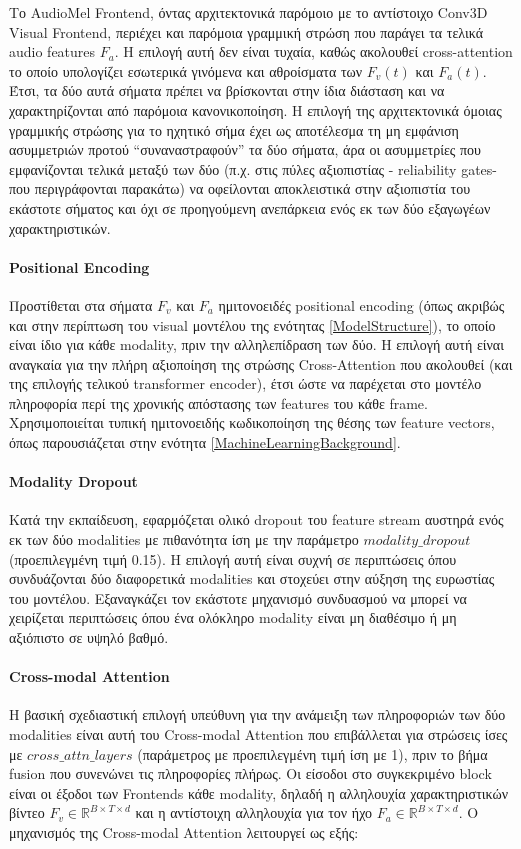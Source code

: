 Το AudioMel Frontend, όντας αρχιτεκτονικά παρόμοιο με το αντίστοιχο Conv3D Visual Frontend, περιέχει και παρόμοια γραμμική στρώση που παράγει τα τελικά audio features $F_a$. Η επιλογή αυτή δεν είναι τυχαία, καθώς ακολουθεί cross-attention το οποίο υπολογίζει εσωτερικά γινόμενα και αθροίσματα των $F_v(t)$ και $F_a(t)$. Έτσι, τα δύο αυτά σήματα πρέπει να βρίσκονται στην ίδια διάσταση και να χαρακτηρίζονται από παρόμοια κανονικοποίηση. Η επιλογή της αρχιτεκτονικά όμοιας γραμμικής στρώσης για το ηχητικό σήμα έχει ως αποτέλεσμα τη μη εμφάνιση ασυμμετριών προτού ``συναναστραφούν'' τα δύο σήματα, άρα οι ασυμμετρίες που εμφανίζονται τελικά μεταξύ των δύο (π.χ. στις πύλες αξιοπιστίας - reliability gates- που περιγράφονται παρακάτω) να οφείλονται αποκλειστικά στην αξιοπιστία του εκάστοτε σήματος και όχι σε προηγούμενη ανεπάρκεια ενός εκ των δύο εξαγωγέων χαρακτηριστικών.

\paragraph{Positional Encoding}
Προστίθεται στα σήματα $F_v$ και $F_a$ ημιτονοειδές positional encoding (όπως ακριβώς και στην περίπτωση του visual μοντέλου της ενότητας \ref{ModelStructure}), το οποίο είναι ίδιο για κάθε modality, πριν την αλληλεπίδραση των δύο. Η επιλογή αυτή είναι αναγκαία για την πλήρη αξιοποίηση της στρώσης Cross-Attention που ακολουθεί (και της επιλογής τελικού transformer encoder), έτσι ώστε να παρέχεται στο μοντέλο πληροφορία περί της χρονικής απόστασης των features του κάθε frame. Χρησιμοποιείται τυπική ημιτονοειδής κωδικοποίηση της θέσης των feature vectors, όπως παρουσιάζεται στην ενότητα \ref{MachineLearningBackground}.

\paragraph{Modality Dropout}
Κατά την εκπαίδευση, εφαρμόζεται ολικό dropout του feature stream αυστηρά ενός εκ των δύο modalities με πιθανότητα ίση με την παράμετρο $modality\_dropout$ (προεπιλεγμένη τιμή 0.15). Η επιλογή αυτή είναι συχνή σε περιπτώσεις όπου συνδυάζονται δύο διαφορετικά modalities και στοχεύει στην αύξηση της ευρωστίας του μοντέλου. Εξαναγκάζει τον εκάστοτε μηχανισμό συνδυασμού να μπορεί να χειρίζεται περιπτώσεις όπου ένα ολόκληρο modality είναι μη διαθέσιμο ή μη αξιόπιστο σε υψηλό βαθμό.

\paragraph{Cross-modal Attention}
Η βασική σχεδιαστική επιλογή υπεύθυνη για την ανάμειξη των πληροφοριών των δύο modalities είναι αυτή του Cross-modal Attention που επιβάλλεται για στρώσεις ίσες με $cross\_attn\_layers$ (παράμετρος με προεπιλεγμένη τιμή ίση με 1), πριν το βήμα fusion που συνενώνει τις πληροφορίες πλήρως. Οι είσοδοι στο συγκεκριμένο block είναι οι έξοδοι των Frontends κάθε modality, δηλαδή η αλληλουχία χαρακτηριστικών βίντεο $F_v \in \mathbb{R}^{B \times T \times d}$ και η αντίστοιχη αλληλουχία για τον ήχο $F_a \in \mathbb{R}^{B \times T \times d}$. Ο μηχανισμός της Cross-modal Attention λειτουργεί ως εξής:

